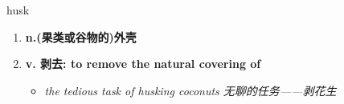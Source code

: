 
\begin{frame}
{\huge husk}
\begin{center}
\begin{enumerate}\Large
  \item \textbf{n.(果类或谷物的)外壳}
  \item \textbf{v. 剥去: to remove the natural covering of}
  \begin{itemize}
    \item \em{\Large{the tedious task of husking coconuts 无聊的任务——剥花生}}
  \end{itemize}
\end{enumerate}
\end{center}
\end{frame}
